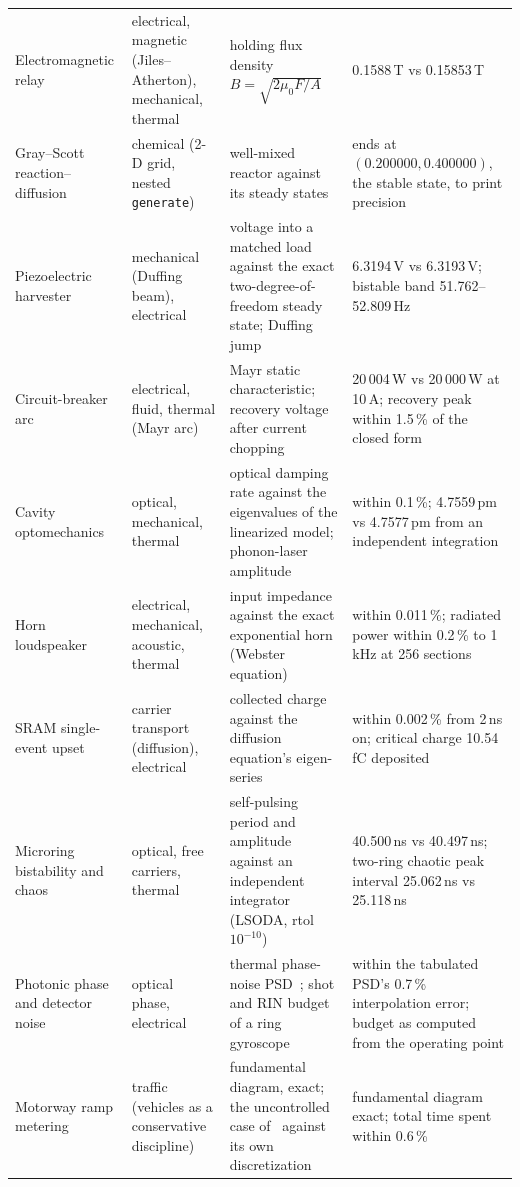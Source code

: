 \begin{table}[!t]
\begin{tabular}{@{}p{}p{}p{}p{}@{}}
    Electromagnetic relay & electrical, magnetic (Jiles--Atherton), mechanical, thermal &
      holding flux density $B = \sqrt{2\mu_0 F/A}$ &
      0.1588\,T vs 0.15853\,T \\
    Gray--Scott reaction--diffusion & chemical (2-D grid, nested \texttt{generate}) &
      well-mixed reactor against its steady states &
      ends at $(0.200000, 0.400000)$, the stable state, to print precision \\
    Piezoelectric harvester & mechanical (Duffing beam), electrical &
      voltage into a matched load against the exact two-degree-of-freedom steady state; Duffing
      jump &
      6.3194\,V vs 6.3193\,V; bistable band 51.762--52.809\,Hz \\
    Circuit-breaker arc & electrical, fluid, thermal (Mayr arc) &
      Mayr static characteristic; recovery voltage after current chopping &
      20\,004\,W vs 20\,000\,W at 10\,A; recovery peak within 1.5\,\% of the closed form \\
    Cavity optomechanics & optical, mechanical, thermal &
      optical damping rate against the eigenvalues of the linearized model; phonon-laser amplitude &
      within 0.1\,\%; 4.7559\,pm vs 4.7577\,pm from an independent integration \\
    Horn loudspeaker & electrical, mechanical, acoustic, thermal &
      input impedance against the exact exponential horn (Webster equation) &
      within 0.011\,\%; radiated power within 0.2\,\% to 1\,kHz at 256 sections \\
    SRAM single-event upset & carrier transport (diffusion), electrical &
      collected charge against the diffusion equation's eigen-series &
      within 0.002\,\% from 2\,ns on; critical charge 10.54\,fC deposited \\
    Microring bistability and chaos & optical, free carriers, thermal &
      self-pulsing period and amplitude against an independent integrator (LSODA, rtol $10^{-10}$) &
      40.500\,ns vs 40.497\,ns; two-ring chaotic peak interval 25.062\,ns vs 25.118\,ns \\
    Photonic phase and detector noise & optical phase, electrical &
      thermal phase-noise PSD~\cite{glenn1989,bartolo2012}; shot and RIN budget of a ring gyroscope &
      within the tabulated PSD's 0.7\,\% interpolation error; budget as computed from the operating point \\
    Motorway ramp metering & traffic (vehicles as a conservative discipline) &
      fundamental diagram, exact; the uncontrolled case of~\cite{bellemans2002} against its own
      discretization &
      fundamental diagram exact; total time spent within 0.6\,\% \\
    \bottomrule
  \end{tabular}
\end{table}


